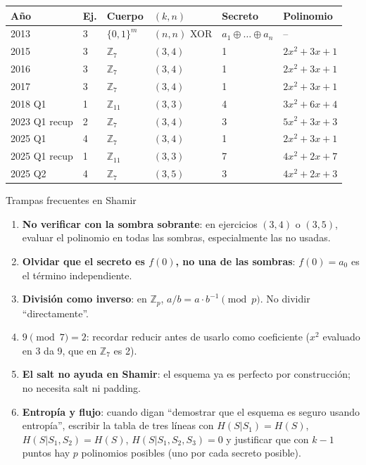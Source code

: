 \documentclass[11pt,a4paper]{article}
\begin{document}
\begin{center}
\renewcommand{\arraystretch}{1.4}
\begin{tabular}{llllll}
\toprule
\textbf{Año} & \textbf{Ej.} & \textbf{Cuerpo} & \textbf{$(k,n)$} & \textbf{Secreto} & \textbf{Polinomio} \\
\midrule
2013 & 3 & $\{0,1\}^m$ & $(n,n)$ XOR & $a_1\oplus\dots\oplus a_n$ & -- \\
2015 & 3 & $\mathbb{Z}_7$ & $(3,4)$ & 1 & $2x^2+3x+1$ \\
2016 & 3 & $\mathbb{Z}_7$ & $(3,4)$ & 1 & $2x^2+3x+1$ \\
2017 & 3 & $\mathbb{Z}_7$ & $(3,4)$ & 1 & $2x^2+3x+1$ \\
2018 Q1 & 1 & $\mathbb{Z}_{11}$ & $(3,3)$ & 4 & $3x^2+6x+4$ \\
2023 Q1 recup & 2 & $\mathbb{Z}_7$ & $(3,4)$ & 3 & $5x^2+3x+3$ \\
2025 Q1 & 4 & $\mathbb{Z}_7$ & $(3,4)$ & 1 & $2x^2+3x+1$ \\
2025 Q1 recup & 1 & $\mathbb{Z}_{11}$ & $(3,3)$ & 7 & $4x^2+2x+7$ \\
2025 Q2 & 4 & $\mathbb{Z}_7$ & $(3,5)$ & 3 & $4x^2+2x+3$ \\
\bottomrule
\end{tabular}
\end{center}

\begin{warnbox}{Trampas frecuentes en Shamir}
\begin{enumerate}
  \item \textbf{No verificar con la sombra sobrante}: en ejercicios $(3,4)$ o $(3,5)$, evaluar el polinomio en todas las sombras, especialmente las no usadas.
  \item \textbf{Olvidar que el secreto es $f(0)$, no una de las sombras}: $f(0)=a_0$ es el término independiente.
  \item \textbf{División como inverso}: en $\mathbb{Z}_p$, $a/b = a \cdot b^{-1} \pmod p$. No dividir ``directamente''.
  \item \textbf{$9 \pmod 7 = 2$}: recordar reducir antes de usarlo como coeficiente ($x^2$ evaluado en 3 da 9, que en $\mathbb{Z}_7$ es 2).
  \item \textbf{El salt no ayuda en Shamir}: el esquema ya es perfecto por construcción; no necesita salt ni padding.
  \item \textbf{Entropía y flujo}: cuando digan ``demostrar que el esquema es seguro usando entropía'', escribir la tabla de tres líneas con $H(S|S_1)=H(S)$, $H(S|S_1,S_2)=H(S)$, $H(S|S_1,S_2,S_3)=0$ y justificar que con $k-1$ puntos hay $p$ polinomios posibles (uno por cada secreto posible).
\end{enumerate}
\end{warnbox}
\end{document}
